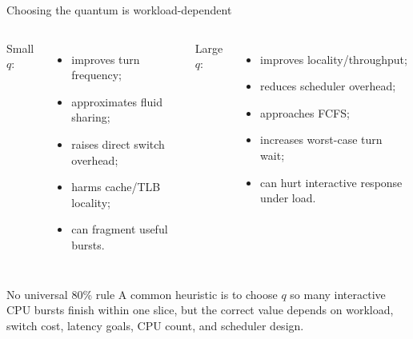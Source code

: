 \documentclass[aspectratio=169,11pt]{beamer}
\begin{document}
\begin{frame}{Choosing the quantum is workload-dependent}
  \begin{columns}[T,onlytextwidth]
      Small $q$:
      \begin{itemize}
        \item improves turn frequency;
        \item approximates fluid sharing;
        \item raises direct switch overhead;
        \item harms cache/TLB locality;
        \item can fragment useful bursts.
      \end{itemize}
      Large $q$:
      \begin{itemize}
        \item improves locality/throughput;
        \item reduces scheduler overhead;
        \item approaches FCFS;
        \item increases worst-case turn wait;
        \item can hurt interactive response under load.
      \end{itemize}
  \end{columns}
  \begin{alertblock}{No universal 80\% rule}
    A common heuristic is to choose $q$ so many interactive CPU bursts finish within one slice, but the correct value depends on workload, switch cost, latency goals, CPU count, and scheduler design.
  \end{alertblock}
\end{frame}
\end{document}

